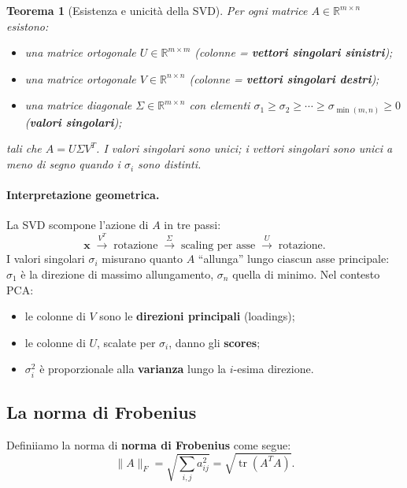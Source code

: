 \documentclass[11pt,a4paper]{article}
\theoremstyle{plain}
\newtheorem{teorema}{Teorema}[section]
\theoremstyle{definition}
\theoremstyle{remark}
\begin{document}
\begin{teorema}[Esistenza e unicità della SVD]
\label{thm:svd}
Per ogni matrice $A \in \mathbb{R}^{m \times n}$ esistono:
\begin{itemize}
  \item una matrice ortogonale $U \in \mathbb{R}^{m \times m}$ (colonne = \textbf{vettori singolari sinistri});
  \item una matrice ortogonale $V \in \mathbb{R}^{n \times n}$ (colonne = \textbf{vettori singolari destri});
  \item una matrice diagonale $\Sigma \in \mathbb{R}^{m \times n}$ con elementi
        $\sigma_1 \geq \sigma_2 \geq \cdots \geq \sigma_{\min(m,n)} \geq 0$
        (\textbf{valori singolari});
\end{itemize}
tali che $A = U \Sigma V^T$. I valori singolari sono unici; i vettori singolari
sono unici a meno di segno quando i $\sigma_i$ sono distinti.
\end{teorema}

\paragraph{Interpretazione geometrica.}
La SVD scompone l'azione di $A$ in tre passi:
\[
  \mathbf{x} \;\xrightarrow{V^T}\; \text{rotazione}
  \;\xrightarrow{\Sigma}\; \text{scaling per asse}
  \;\xrightarrow{U}\; \text{rotazione}.
\]
I valori singolari $\sigma_i$ misurano quanto $A$ ``allunga'' lungo ciascun asse
principale: $\sigma_1$ è la direzione di massimo allungamento, $\sigma_n$ quella
di minimo. Nel contesto PCA:
\begin{itemize}
  \item le colonne di $V$ sono le \textbf{direzioni principali} (loadings);
  \item le colonne di $U$, scalate per $\sigma_i$, danno gli \textbf{scores};
  \item $\sigma_i^2$ è proporzionale alla \textbf{varianza} lungo la $i$-esima direzione.
\end{itemize}

\subsection{La norma di Frobenius}

Definiiamo la norma di \textbf{norma di Frobenius} come segue:
\[
  \|A\|_F = \sqrt{\sum_{i,j} a_{ij}^2} = \sqrt{\operatorname{tr}(A^T A)}.
\] \label{eq:frob_metrica}
\end{document}
